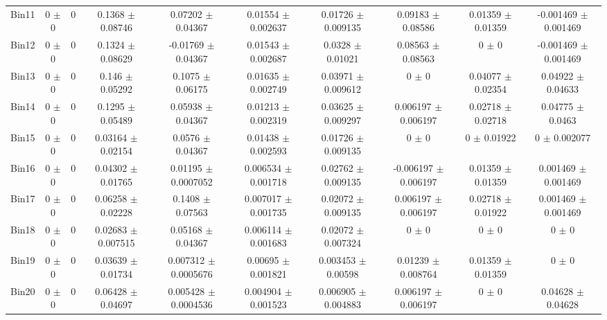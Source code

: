 \begin{tabular}{@{\extracolsep{4pt}}lccccccccc@{}}
     Bin11 & 0 $\pm$ 0 & 0 & 0.1368 $\pm$ 0.08746 & 0.07202 $\pm$ 0.04367 & 0.01554 $\pm$ 0.002637 & 0.01726 $\pm$ 0.009135 & 0.09183 $\pm$ 0.08586 & 0.01359 $\pm$ 0.01359 & -0.001469 $\pm$ 0.001469 \\ 
     Bin12 & 0 $\pm$ 0 & 0 & 0.1324 $\pm$ 0.08629 & -0.01769 $\pm$ 0.04367 & 0.01543 $\pm$ 0.002687 & 0.0328 $\pm$ 0.01021 & 0.08563 $\pm$ 0.08563 & 0 $\pm$ 0 & -0.001469 $\pm$ 0.001469 \\ 
     Bin13 & 0 $\pm$ 0 & 0 & 0.146 $\pm$ 0.05292 & 0.1075 $\pm$ 0.06175 & 0.01635 $\pm$ 0.002749 & 0.03971 $\pm$ 0.009612 & 0 $\pm$ 0 & 0.04077 $\pm$ 0.02354 & 0.04922 $\pm$ 0.04633 \\ 
     Bin14 & 0 $\pm$ 0 & 0 & 0.1295 $\pm$ 0.05489 & 0.05938 $\pm$ 0.04367 & 0.01213 $\pm$ 0.002319 & 0.03625 $\pm$ 0.009297 & 0.006197 $\pm$ 0.006197 & 0.02718 $\pm$ 0.02718 & 0.04775 $\pm$ 0.0463 \\ 
     Bin15 & 0 $\pm$ 0 & 0 & 0.03164 $\pm$ 0.02154 & 0.0576 $\pm$ 0.04367 & 0.01438 $\pm$ 0.002593 & 0.01726 $\pm$ 0.009135 & 0 $\pm$ 0 & 0 $\pm$ 0.01922 & 0 $\pm$ 0.002077 \\ 
     Bin16 & 0 $\pm$ 0 & 0 & 0.04302 $\pm$ 0.01765 & 0.01195 $\pm$ 0.0007052 & 0.006534 $\pm$ 0.001718 & 0.02762 $\pm$ 0.009135 & -0.006197 $\pm$ 0.006197 & 0.01359 $\pm$ 0.01359 & 0.001469 $\pm$ 0.001469 \\ 
     Bin17 & 0 $\pm$ 0 & 0 & 0.06258 $\pm$ 0.02228 & 0.1408 $\pm$ 0.07563 & 0.007017 $\pm$ 0.001735 & 0.02072 $\pm$ 0.009135 & 0.006197 $\pm$ 0.006197 & 0.02718 $\pm$ 0.01922 & 0.001469 $\pm$ 0.001469 \\ 
     Bin18 & 0 $\pm$ 0 & 0 & 0.02683 $\pm$ 0.007515 & 0.05168 $\pm$ 0.04367 & 0.006114 $\pm$ 0.001683 & 0.02072 $\pm$ 0.007324 & 0 $\pm$ 0 & 0 $\pm$ 0 & 0 $\pm$ 0 \\ 
     Bin19 & 0 $\pm$ 0 & 0 & 0.03639 $\pm$ 0.01734 & 0.007312 $\pm$ 0.0005676 & 0.00695 $\pm$ 0.001821 & 0.003453 $\pm$ 0.00598 & 0.01239 $\pm$ 0.008764 & 0.01359 $\pm$ 0.01359 & 0 $\pm$ 0 \\ 
     Bin20 & 0 $\pm$ 0 & 0 & 0.06428 $\pm$ 0.04697 & 0.005428 $\pm$ 0.0004536 & 0.004904 $\pm$ 0.001523 & 0.006905 $\pm$ 0.004883 & 0.006197 $\pm$ 0.006197 & 0 $\pm$ 0 & 0.04628 $\pm$ 0.04628 \\ 
\hline\hline
  \end{tabular}
